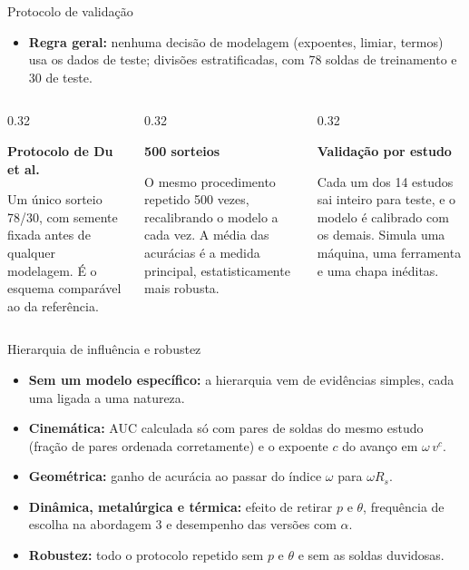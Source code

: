 \documentclass[aspectratio=169,11pt]{beamer}
\newenvironment{bullets}{\begin{itemize}\setlength{\itemsep}{5pt}}{\end{itemize}}
\newcommand{\caixa}[1]{\colorbox{fundocaixa}{\parbox{0.92\linewidth}{\centering #1}}}
\begin{document}
\begin{frame}{Protocolo de validação}
\begin{bullets}
  \item \textbf{Regra geral:} nenhuma decisão de modelagem (expoentes, limiar, termos) usa os dados de teste; divisões estratificadas, com 78 soldas de treinamento e 30 de teste.
\end{bullets}
\vspace{0.15cm}
\begin{columns}[T,onlytextwidth]
\begin{column}{0.32\textwidth}
\caixa{\small\textbf{Protocolo de Du et al.}}\par\vspace{4pt}
\scriptsize Um único sorteio 78/30, com semente fixada antes de qualquer modelagem. É o esquema comparável ao da referência.
\end{column}
\begin{column}{0.32\textwidth}
\caixa{\small\textbf{500 sorteios}}\par\vspace{4pt}
\scriptsize O mesmo procedimento repetido 500 vezes, recalibrando o modelo a cada vez. A média das acurácias é a medida principal, estatisticamente mais robusta.
\end{column}
\begin{column}{0.32\textwidth}
\caixa{\small\textbf{Validação por estudo}}\par\vspace{4pt}
\scriptsize Cada um dos 14 estudos sai inteiro para teste, e o modelo é calibrado com os demais. Simula uma máquina, uma ferramenta e uma chapa inéditas.
\end{column}
\end{columns}
\end{frame}

\begin{frame}{Hierarquia de influência e robustez}
\begin{bullets}
  \item \textbf{Sem um modelo específico:} a hierarquia vem de evidências simples, cada uma ligada a uma natureza.
  \item \textbf{Cinemática:} AUC calculada só com pares de soldas do mesmo estudo (fração de pares ordenada corretamente) e o expoente $c$ do avanço em $\omega\,v^{c}$.
  \item \textbf{Geométrica:} ganho de acurácia ao passar do índice $\omega$ para $\omega R_s$.
  \item \textbf{Dinâmica, metalúrgica e térmica:} efeito de retirar $p$ e $\theta$, frequência de escolha na abordagem 3 e desempenho das versões com $\alpha$.
  \item \textbf{Robustez:} todo o protocolo repetido sem $p$ e $\theta$ e sem as soldas duvidosas.
\end{bullets}
\end{frame}
\end{document}
